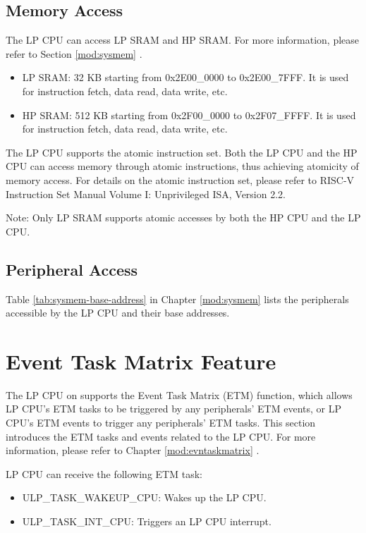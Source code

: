 \documentclass[main\_\_EN.tex]{subfiles}
\begin{document}
\subsection{Memory Access}

The \chipname{} LP CPU can access LP SRAM and HP SRAM. For more information, please refer to Section \ref{mod:sysmem} \textit{}.
\begin{itemize}
    \item LP SRAM: 32 KB starting from 0x2E00\_0000 to 0x2E00\_7FFF. It is used for instruction fetch, data read, data write, etc.
    \item HP SRAM: 512 KB starting from 0x2F00\_0000 to 0x2F07\_FFFF. It is used for instruction fetch, data read, data write, etc.
\end{itemize}


The LP CPU supports the atomic instruction set. Both the LP CPU and the HP CPU can access memory through atomic instructions, thus achieving atomicity of memory access. For details on the atomic instruction set, please refer to RISC-V Instruction Set Manual Volume I: Unprivileged ISA, Version 2.2.

Note: Only LP SRAM supports atomic accesses by both the HP CPU and the LP CPU.

\subsection{Peripheral Access}

Table \ref{tab:sysmem-base-address} in Chapter \ref{mod:sysmem} \textit{} lists the peripherals accessible by the LP CPU and their base addresses.

\section{Event Task Matrix Feature}
\label{sec:ulp-etm-func}

The LP CPU on \chipname{} supports the Event Task Matrix (ETM) function, which allows LP CPU's ETM tasks to be triggered by any peripherals' ETM events, or LP CPU's ETM events to trigger any peripherals' ETM tasks. This section introduces the ETM tasks and events related to the LP CPU. For more information, please refer to Chapter \ref{mod:evntaskmatrix} .

LP CPU can receive the following ETM task:

\begin{itemize}
    \item ULP\_TASK\_WAKEUP\_CPU: Wakes up the LP CPU.
    \item ULP\_TASK\_INT\_CPU: Triggers an LP CPU interrupt.
\end{itemize}
\end{document}
